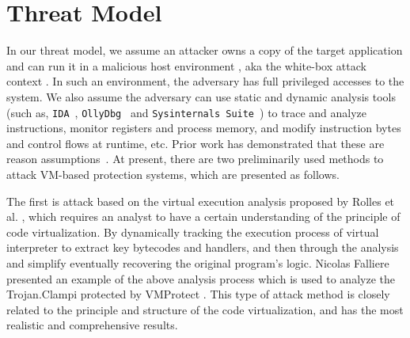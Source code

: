 \section{Threat Model}\label{sec:threat-model}
In our threat model, we assume an attacker owns a copy of the target application and can run it in a malicious host environment \cite{collberg2002watermarking}, aka the white-box attack context \cite{chow2003white,liem2008compiler}.
In such an environment, the adversary has full privileged accesses to the system. We also assume the adversary can use static and dynamic analysis tools (such as, \texttt{IDA}~\cite{ida}, \texttt{OllyDbg}~\cite{od} and \texttt{Sysinternals Suite}~\cite{sysinternals}) to trace and analyze instructions, monitor registers and process memory, and modify instruction bytes and control flows at runtime, etc.
Prior work has demonstrated that these are reason assumptions~\cite{falliere2009inside}.
At present, there are two preliminarily used methods to attack VM-based protection systems, which are presented as follows.

The first is attack based on the virtual execution analysis proposed by Rolles et al. \cite{rolles2009unpacking}, which requires an analyst to have a certain understanding of the principle of code virtualization. By dynamically tracking the execution process of virtual interpreter to extract key bytecodes and handlers, and then through the analysis and simplify eventually recovering the original program's logic. Nicolas Falliere \cite{falliere2009inside} presented an example of the above analysis process which is used to analyze the Trojan.Clampi protected by VMProtect \cite{vmp}.
This type of attack method is closely related to the principle and structure of the code virtualization, and has the most realistic and comprehensive results.


